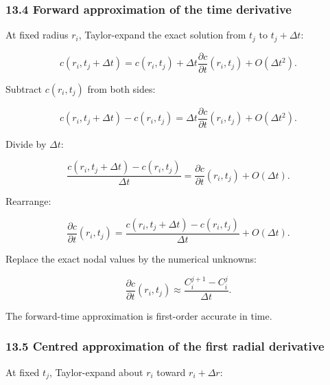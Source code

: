 \documentclass[11pt,a4paper]{article}
\begin{document}
\subsubsection*{13.4 Forward approximation of the time derivative}

At fixed radius $r_i$, Taylor-expand the exact solution from $t_j$ to $t_j+\Delta t$:

\begin{equation}
c(r_i,t_j+\Delta t)
=
c(r_i,t_j)
+
\Delta t
\frac{\partial c}{\partial t}(r_i,t_j)
+
O(\Delta t^2).
\tag{TRISO-DIS-112}
\label{eq:triso-dis-112}
\end{equation}

Subtract $c(r_i,t_j)$ from both sides:

\begin{equation}
c(r_i,t_j+\Delta t)-c(r_i,t_j)
=
\Delta t
\frac{\partial c}{\partial t}(r_i,t_j)
+
O(\Delta t^2).
\tag{TRISO-DIS-113}
\label{eq:triso-dis-113}
\end{equation}

Divide by $\Delta t$:

\begin{equation}
\frac{
c(r_i,t_j+\Delta t)-c(r_i,t_j)
}{
\Delta t
}
=
\frac{\partial c}{\partial t}(r_i,t_j)
+
O(\Delta t).
\tag{TRISO-DIS-114}
\label{eq:triso-dis-114}
\end{equation}

Rearrange:

\begin{equation}
\frac{\partial c}{\partial t}(r_i,t_j)
=
\frac{
c(r_i,t_j+\Delta t)-c(r_i,t_j)
}{
\Delta t
}
+
O(\Delta t).
\tag{TRISO-DIS-115}
\label{eq:triso-dis-115}
\end{equation}

Replace the exact nodal values by the numerical unknowns:

\begin{equation}
\boxed{
\frac{\partial c}{\partial t}(r_i,t_j)
\approx
\frac{C_i^{j+1}-C_i^j}{\Delta t}.
}
\tag{TRISO-DIS-116}
\label{eq:triso-dis-116}
\end{equation}

The forward-time approximation is first-order accurate in time.

\subsubsection*{13.5 Centred approximation of the first radial derivative}

At fixed $t_j$, Taylor-expand about $r_i$ toward $r_i+\Delta r$:
\end{document}
